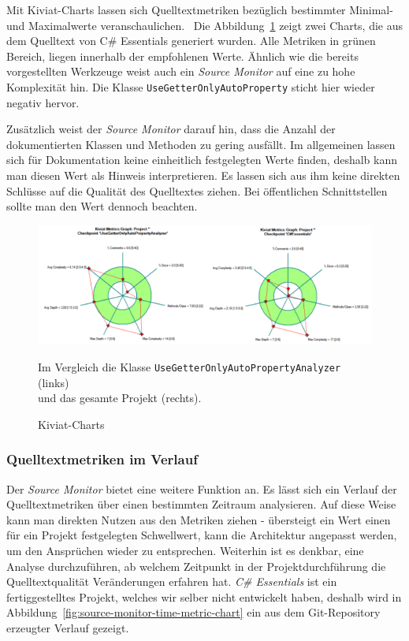 Mit Kiviat-Charts lassen sich Quelltextmetriken bezüglich bestimmter Minimal- und Maximalwerte veranschaulichen.~\cite{kiviat} Die Abbildung~\ref{fig:source-monitor-kiviat-chart} zeigt zwei Charts, die aus dem Quelltext von C\# Essentials generiert wurden. Alle Metriken in grünen Bereich, liegen innerhalb der empfohlenen Werte. Ähnlich wie die bereits vorgestellten Werkzeuge weist auch ein \emph{Source Monitor} auf eine zu hohe Komplexität hin. Die Klasse \texttt{UseGetterOnlyAutoProperty} sticht hier wieder negativ hervor.

Zusätzlich weist der \emph{Source Monitor} darauf hin, dass die Anzahl der dokumentierten Klassen und Methoden zu gering ausfällt. Im allgemeinen lassen sich für Dokumentation keine einheitlich festgelegten Werte finden, deshalb kann man diesen Wert als Hinweis interpretieren. Es lassen sich aus ihm keine direkten Schlüsse auf die Qualität des Quelltextes ziehen. Bei öffentlichen Schnittstellen sollte man den Wert dennoch beachten.

\begin{figure}[!ht]
	\centering
	\includegraphics[width=\textwidth]{images/source-monitor-kiviat-chart.png}
	\caption{Kiviat-Charts}
	\vspace{0.1cm}
	Im Vergleich die Klasse \texttt{UseGetterOnlyAutoPropertyAnalyzer} (links) \\ und das gesamte Projekt (rechts).
	\label{fig:source-monitor-kiviat-chart}
\end{figure}

\newpage

\subsubsection{Quelltextmetriken im Verlauf}
Der \emph{Source Monitor} bietet eine weitere Funktion an. Es lässt sich ein Verlauf der Quelltextmetriken über einen bestimmten Zeitraum analysieren. Auf diese Weise kann man direkten Nutzen aus den Metriken ziehen - übersteigt ein Wert einen für ein Projekt festgelegten Schwellwert, kann die Architektur angepasst werden, um den Ansprüchen wieder zu entsprechen. Weiterhin ist es denkbar, eine Analyse durchzuführen, ab welchem Zeitpunkt in der Projektdurchführung die Quelltextqualität Veränderungen erfahren hat. \emph{C\# Essentials} ist ein fertiggestelltes Projekt, welches wir selber nicht entwickelt haben, deshalb wird in Abbildung~\ref{fig:source-monitor-time-metric-chart} ein aus dem Git-Repository erzeugter Verlauf gezeigt.

